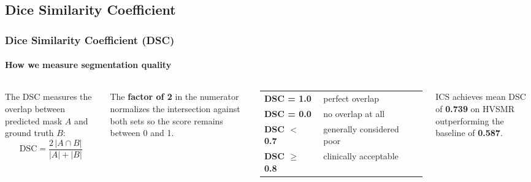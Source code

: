 \documentclass[nometaot,lecture,amberg,toc=twocolumn,indicatelastpageofframe,footlinebox]{OTHAWbeamer}
\begin{document}
\subsection{Dice Similarity Coefficient}
\begin{frame}[t, label=dscslide]
    \frametitle{Dice Similarity Coefficient (DSC)}
    \framesubtitle{How we measure segmentation quality}

    \begin{columns}[T]
            \vspace{0.3cm}
            The DSC measures the overlap between predicted mask $A$ and ground truth $B$:
            \[
                \text{DSC} = \frac{2\,|A \cap B|}{|A| + |B|}
            \]

            \vspace{0.4em}
            The \textcolor{orange1}{\textbf{factor of 2}} in the numerator normalizes the
            intersection against both sets so the score remains between 0 and 1.

            \vspace{0.6em}
            \begin{tabular}{ll}
                \textcolor{orange1}{\textbf{DSC = 1.0}} & perfect overlap \\[4pt]
                \textcolor{orange1}{\textbf{DSC = 0.0}} & no overlap at all \\[4pt]
                \textcolor{grau2}{\textbf{DSC $<$ 0.7}} & generally considered poor \\[4pt]
                \textcolor{grau2}{\textbf{DSC $\geq$ 0.8}} & clinically acceptable \\
            \end{tabular}

            \vspace{0.3cm}
            \centering

            \vspace{0.8em}
            \begin{alertblock}{}
                \centering
                ICS achieves mean DSC of \textbf{0.739} on HVSMR outperforming the baseline
                of \textbf{0.587}.
            \end{alertblock}
    \end{columns}

\end{frame}
\end{document}
